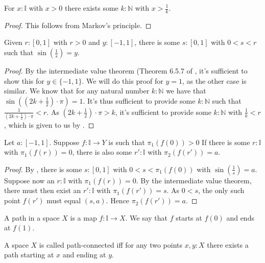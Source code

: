 \documentclass{../util/zariski}
\begin{document}
\begin{lemma}\label{postiveNumbersCharacter}
  For $x:\mathbb I$ with $x>0$ there exists some $k:\mathbb N$ with $x>\frac1k$. 
\end{lemma}
\begin{proof}
  This follows from Markov's principle.
\end{proof}

\begin{lemma}\label{sinCharacter}
  Given $r:[0,1]$ with $r>0$ and 
  $y:[-1,1]$, there is some $s:[0,1]$ with $0<s<r$ such that 
  $\sin(\frac1s) = y$. 
\end{lemma}
\begin{proof}
  By the intermediate value theorem (Theorem 6.5.7 of \cite{synthetic-stone-duality}, 
  it's sufficient to show this for $y \in \{-1,1\}$. 
  We will do this proof for $y = 1$, as the other case is similar. 
  We know that for any natural number $k:\mathbb N$ we have that 
  $\sin( (2 k + \frac12)\cdot \pi) = 1$. 
  It's thus sufficient to provide some $k:\mathbb N$ such that $\frac1{(2k+\frac12)\cdot \pi}<r$. 
  As $(2k+\frac12)\cdot \pi>k$, it's sufficient to provide some $k:\mathbb N$ with $\frac1k<r$, 
  which is given to us by .
\end{proof}
\begin{lemma}\label{topologistsSineCurveWillHitInfinitelyManyTimes}
  Let $a:[-1,1]$. 
  Suppose $f:\mathbb I \to Y$ is such that $\pi_1(f(0)) > 0$
  If there is some $r:\mathbb I$ with $\pi_1(f(r)) = 0$, 
  there is also some $r':\mathbb I$ with $\pi_2(f(r')) = a$. 
\end{lemma}
\begin{proof}
  By , there is some $s:[0,1]$ with $0<s<\pi_1(f(0))$ with $\sin(\frac1s) = a$. 
  Suppose now an $r:\mathbb I$ with $\pi_1(f(r)) = 0$. 
  By the intermediate value theorem, there must then exist an $r':\mathbb I$ with $\pi_1(f(r')) = s$. 
  As $0<s$, the only such point $f(r')$ must equal $(s, a)$.
  Hence $\pi_2(f(r')) = a$. 
\end{proof}

\begin{definition}
  A path in a space $X$ is a map $f:\mathbb I \to X$. 
  We say that $f$ starts at $f(0)$ and ends at $f(1)$. 
\end{definition}
\begin{definition}
  A space $X$ is called path-connected iff for any two points $x,y:X$ there
  exists a path starting at $x$ and ending at $y$. 
\end{definition}
\end{document}
